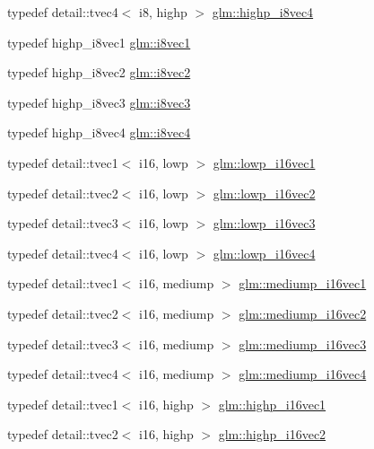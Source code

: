 \begin{CompactItemize}
typedef detail::tvec4$<$ i8, highp $>$ \hyperlink{group__gtc__type__precision_g283b2f580a4bd7207d27418ef4a1068b}{glm::highp\_\-i8vec4}
\item 
typedef highp\_\-i8vec1 \hyperlink{group__gtc__type__precision_ge67d2e1e7ebd1a79176cac554395b881}{glm::i8vec1}
\item 
typedef highp\_\-i8vec2 \hyperlink{group__gtc__type__precision_gfd7bbd3878c298014276975f999a8677}{glm::i8vec2}
\item 
typedef highp\_\-i8vec3 \hyperlink{group__gtc__type__precision_ge1e3127c58fbf1b6fbf28885cfd3dfad}{glm::i8vec3}
\item 
typedef highp\_\-i8vec4 \hyperlink{group__gtc__type__precision_g89bb5e6481ae11fb2599b71e36a390bb}{glm::i8vec4}
\item 
typedef detail::tvec1$<$ i16, lowp $>$ \hyperlink{group__gtc__type__precision_g6f1e42c07424a2f14faf731c74ba2153}{glm::lowp\_\-i16vec1}
\item 
typedef detail::tvec2$<$ i16, lowp $>$ \hyperlink{group__gtc__type__precision_g47c5d4c919266799ecc76d832356feff}{glm::lowp\_\-i16vec2}
\item 
typedef detail::tvec3$<$ i16, lowp $>$ \hyperlink{group__gtc__type__precision_g5b71f24a26316aa21f3c58d25c8db9a8}{glm::lowp\_\-i16vec3}
\item 
typedef detail::tvec4$<$ i16, lowp $>$ \hyperlink{group__gtc__type__precision_g59ea63973187e1e990fb6633d1800c6d}{glm::lowp\_\-i16vec4}
\item 
typedef detail::tvec1$<$ i16, mediump $>$ \hyperlink{group__gtc__type__precision_g6a1d37139ea8990de24edf4bfa3500ad}{glm::mediump\_\-i16vec1}
\item 
typedef detail::tvec2$<$ i16, mediump $>$ \hyperlink{group__gtc__type__precision_g664a0266910df3c2d6559651f94d32e6}{glm::mediump\_\-i16vec2}
\item 
typedef detail::tvec3$<$ i16, mediump $>$ \hyperlink{group__gtc__type__precision_gd9e470f707da812fe454505c99035471}{glm::mediump\_\-i16vec3}
\item 
typedef detail::tvec4$<$ i16, mediump $>$ \hyperlink{group__gtc__type__precision_gd9aca299fc3e96c84be6b063381c9f3e}{glm::mediump\_\-i16vec4}
\item 
typedef detail::tvec1$<$ i16, highp $>$ \hyperlink{group__gtc__type__precision_g0ed3103e2d3acb4efbe313add4243a72}{glm::highp\_\-i16vec1}
\item 
typedef detail::tvec2$<$ i16, highp $>$ \hyperlink{group__gtc__type__precision_g74df9e215c049f82d277473c4c974bb4}{glm::highp\_\-i16vec2}

\end{CompactItemize}
